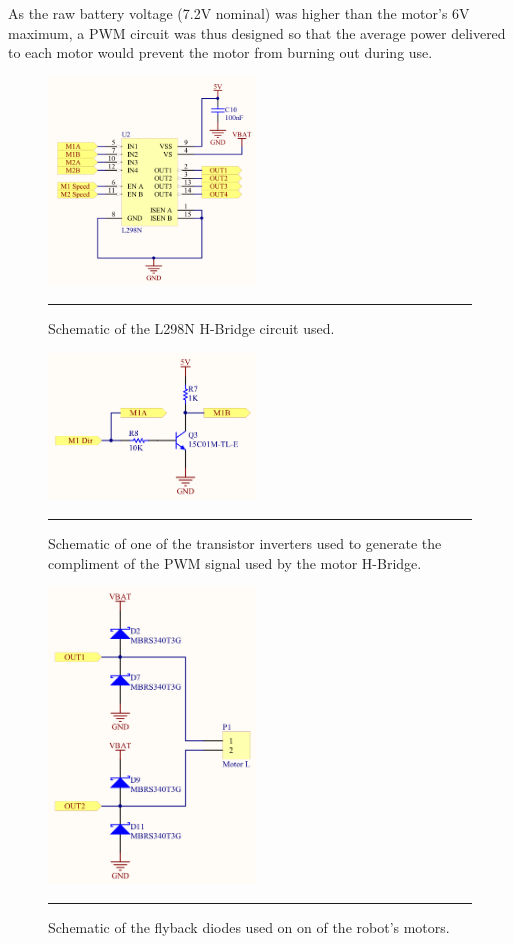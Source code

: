 As the raw battery voltage (7.2V nominal) was higher than the motor's 6V maximum, a PWM circuit was thus designed so that the average power delivered to each motor would prevent the motor from burning out during use.

\begin{figure}[h]
	\centering
		\includegraphics[width=55mm]{./Figures/PWMDriver.png}
	\rule{35em}{0.5pt}
	\caption[Motor H-Bridge Schematic]{Schematic of the L298N H-Bridge circuit used.}
	\label{fig:pwmdriver}
\end{figure}

\begin{figure}[h]
	\centering
		\includegraphics[width=55mm]{./Figures/TransistorInverter.png}
	\rule{35em}{0.5pt}
	\caption[Transistor Inverter Schematic]{Schematic of one of the transistor inverters used to generate the compliment of the PWM signal used by the motor H-Bridge.}
	\label{fig:transistorinverter}
\end{figure}

\begin{figure}[h]
	\centering
		\includegraphics[width=55mm]{./Figures/FlybackDiodes.png}
	\rule{35em}{0.5pt}
	\caption[Motor Flyback Diodes Schematic]{Schematic of the flyback diodes used on on of the robot's motors.}
	\label{fig:flybackdiodes}
\end{figure}

